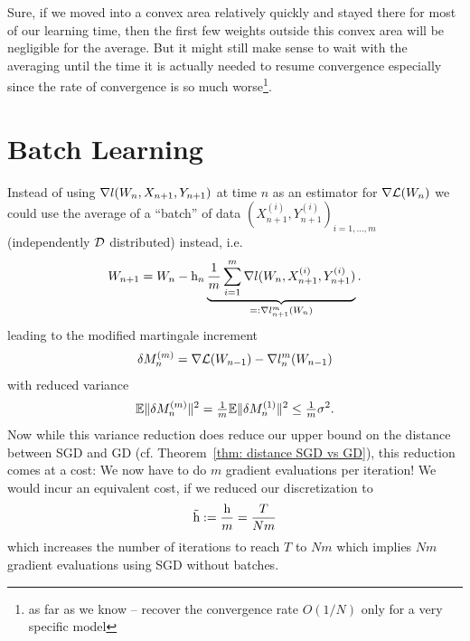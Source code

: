 Sure, if we moved into a convex area relatively quickly and stayed there for
most of our learning time, then the first few weights outside this convex
area will be negligible for the average.
But it might still make sense to wait with the averaging until the time it is
actually needed to resume convergence especially since the rate of convergence
is so much worse\footnote{
	as far as we know -- \textcite{bachNonstronglyconvexSmoothStochastic2013}
	recover the convergence rate \(O(1/N)\) only for a very specific model
}.

\section{Batch Learning}

Instead of using \(\nabla l(W_n, X_{n+1}, Y_{n+1})\) at time \(n\) as an
estimator for \(\nabla\mathcal{L}(W_n)\) we could use the average of a
``batch'' of data \((X^{(i)}_{n+1}, Y^{(i)}_{n+1})_{i=1,\dots,m}\) (independently
\(\mathcal{D}\) distributed) instead, i.e.
\begin{align*}
	W_{n+1} = W_n
	-\text{h}_n \underbrace{\frac1{m}\sum_{i=1}^m\nabla l(W_n,X^{(i)}_{n+1}, Y^{(i)}_{n+1})}_{
		=:\nabla l_{n+1}^m(W_n)
	}.
\end{align*}
leading to the modified martingale increment
\begin{align*}
	\delta M_n^{(m)}
	= \nabla\mathcal{L}(W_{n-1})
	- \nabla l_n^m(W_{n-1})
\end{align*}
with reduced variance
\begin{align*}
	\mathbb{E}\|\delta M_n^{(m)}\|^2 = \tfrac1m\mathbb{E}\|\delta M_n^{(1)}\|^2 \le \tfrac1m \sigma^2.
\end{align*}
Now while this variance reduction does reduce our upper bound on the distance
between SGD and GD (cf. Theorem~\ref{thm: distance SGD vs GD}), this reduction
comes at a cost: We now have to do \(m\) gradient evaluations per iteration!
We would incur an equivalent cost, if we reduced our discretization to
\begin{align*}
	\tilde{\text{h}}:=\frac{\text{h}}{m}=\frac{T}{Nm}
\end{align*}
which increases the number of iterations to reach \(T\) to \(Nm\) which implies
\(Nm\) gradient evaluations using SGD without batches.

